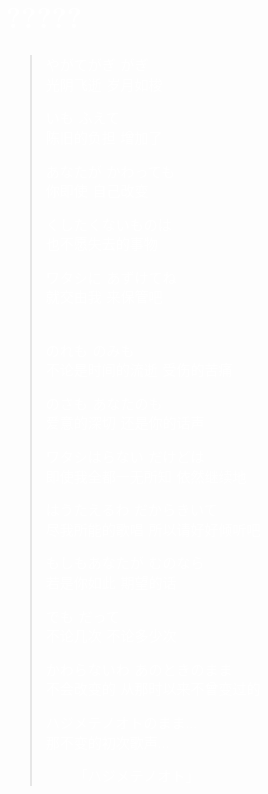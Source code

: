 \documentclass{article}
\theoremstyle{nonumberplain}
\begin{document}
\section*{\textcolor{white}{?????}}
\begin{quote}
	\textcolor{white}{やがてがぎ がぎ\\
		光阴飞逝 岁月如梭}

	\textcolor{white}{いも ふえて\\
		陈旧的负担 增加了}

	\textcolor{white}{あなたが かわっても\\
		你即使 自己改变}

	\textcolor{white}{くしたくないものは\\
		也不愿失去的事物}

	\textcolor{white}{ワタシに あずけてね\\
		就交由我 来保管吧}

	\ \\

	\textcolor{white}{のれも のみも\\
		不论是时间的流逝 受伤的苦痛}

	\textcolor{white}{のさも あなたのも\\
		爱意的深切 还是你的话声}

	\textcolor{white}{ワタシはらない だけどは\\
		即使我全都一无所知 依然继续地}

	\textcolor{white}{はうたえるわ だからきいて\\
		尽我所能的歌唱 所以请好好倾听吧}

	\textcolor{white}{もしもあなたが むのなら\\
		若是你如此 期望的话}

	\textcolor{white}{でも だって\\
		不论几次 不论多少次}

	\textcolor{white}{かわらないわ あのときのまま\\
		不会改变的 从那时以来不曾变过的}

	\textcolor{white}{ハジメテノオトのまま...\\
		那不变的初次歌声...}

	\begin{flushright}\textcolor{white}{------「ハジメテノオト」}\end{flushright}
\end{quote}
\end{document}
